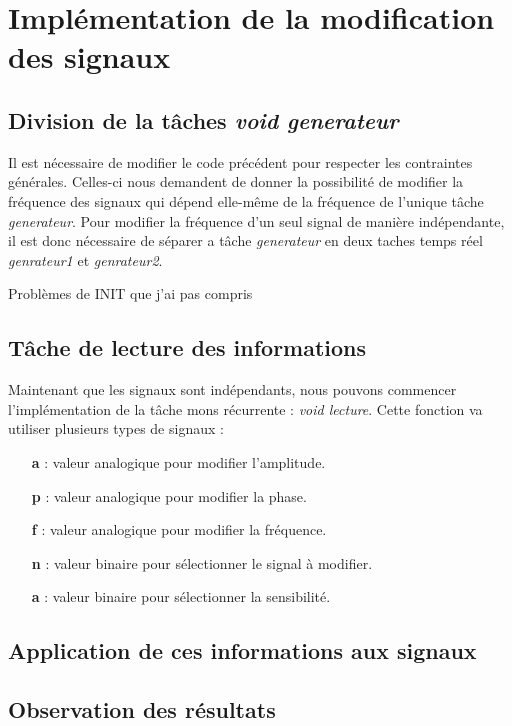 \section{Implémentation de la modification des signaux}

\subsection{Division de la tâches \emph{void generateur}}	
Il est nécessaire de modifier le code précédent pour respecter les contraintes générales. Celles-ci nous demandent de donner la possibilité de modifier la fréquence des signaux qui dépend elle-même de la fréquence de l'unique tâche \emph{generateur}. Pour modifier la fréquence d'un seul signal de manière indépendante, il est donc nécessaire de séparer a tâche \emph{generateur} en deux taches temps réel \emph{genrateur1} et \emph{genrateur2}. 

Problèmes de INIT que j'ai pas compris
\subsection{Tâche de lecture des informations}
Maintenant que les signaux sont indépendants, nous pouvons commencer l'implémentation de la tâche mons récurrente : \emph{void lecture}. Cette fonction va utiliser plusieurs types de signaux : 
\begin{itemize}
\item[\textbf{a} :]valeur analogique pour modifier l'amplitude.
\item[\textbf{p} :]valeur analogique pour modifier la phase.
\item[\textbf{f} :]valeur analogique pour modifier la fréquence.
\item[\textbf{n} :]valeur binaire pour sélectionner le signal à modifier.
\item[\textbf{a} :]valeur binaire pour sélectionner la sensibilité.
\end{itemize}

\subsection{Application de ces informations aux signaux}


\subsection{Observation des résultats}